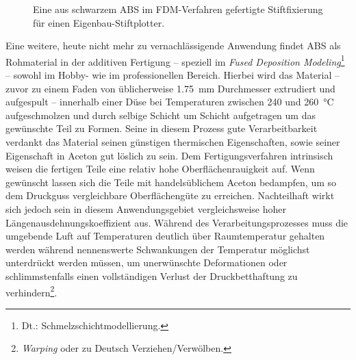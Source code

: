             \begin{figure}
                \centering
                \vspace{-\baselineskip}
                \caption[Eine aus schwarzem ABS im FDM-Verfahren gefertigte Stiftfixierung]{Eine aus schwarzem ABS im FDM-Verfahren gefertigte Stiftfixierung für einen Eigenbau-Stiftplotter.}%
                \label{fig:3dDruck ABS teil}
            \end{figure}
            Eine weitere, heute nicht mehr zu vernachlässigende Anwendung findet ABS als Rohmaterial in der additiven Fertigung
             – speziell im \textit{Fused Deposition Modeling}\footnote{Dt.: Schmelzschichtmodellierung.} – sowohl im Hobby-
            wie im professionellen Bereich. Hierbei wird das Material – zuvor zu einem Faden von üblicherweise \SI{1,75}{mm}
            Durchmesser extrudiert und aufgespult – innerhalb einer Düse bei Temperaturen zwischen \SI{240}{} und \SI{260}{\celsius} aufgeschmolzen
            und durch selbige Schicht um Schicht aufgetragen um das gewünschte Teil zu Formen. Seine in diesem Prozess gute
            Verarbeitbarkeit verdankt das Material seinen günstigen thermischen Eigenschaften, sowie seiner Eigenschaft in
            Aceton gut löslich zu sein. Dem Fertigungsverfahren intrinsisch weisen die fertigen Teile eine relativ hohe
            Oberflächenrauigkeit auf. Wenn gewünscht lassen sich die Teile mit handelsüblichem Aceton bedampfen, um so
            dem Druckguss vergleichbare Oberflächengüte zu erreichen. Nachteilhaft wirkt sich jedoch sein in diesem Anwendungsgebiet
            vergleichsweise hoher Längenausdehnungskoeffizient aus. Während des Verarbeitungsprozesses muss die umgebende Luft
            auf Temperaturen deutlich über Raumtemperatur gehalten werden während nennenswerte Schwankungen der Temperatur
            möglichst unterdrückt werden müssen, um unerwünschte Deformationen oder schlimmstenfalls einen vollständigen
            Verlust der Druckbetthaftung zu verhindern\footnote{\textit{Warping} oder zu Deutsch Verziehen/Verwölben.}.

